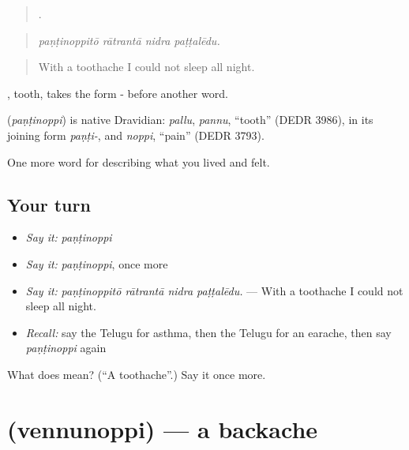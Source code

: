 \begin{quote}
   .
\end{quote}

\begin{quote}
\emph{paṇṭinoppitō rātrantā nidra paṭṭalēdu.}
\end{quote}

\begin{quote}
With a toothache I could not sleep all night.
\end{quote}

, tooth, takes the form - before another word.

\begin{cousinweb}
\textbf{} (\emph{paṇṭinoppi}) is native Dravidian: \emph{pallu}, \emph{pannu}, \textquotedblleft{}tooth\textquotedblright{} (DEDR 3986), in its joining form \emph{paṇṭi-}, and \emph{noppi}, \textquotedblleft{}pain\textquotedblright{} (DEDR 3793).
\end{cousinweb}

\begin{grammarlens}[title={What you've built}]
One more word for describing what you lived and felt.
\end{grammarlens}

\subsection*{Your turn}
\begin{itemize}
\raggedright
  \item \emph{Say it:} \emph{paṇṭinoppi}
  \item \emph{Say it:} \emph{paṇṭinoppi}, once more
  \item \emph{Say it:} \emph{paṇṭinoppitō rātrantā nidra paṭṭalēdu.} — With a toothache I could not sleep all night.
  \item \emph{Recall:} say the Telugu for asthma, then the Telugu for an earache, then say \emph{paṇṭinoppi} again
\end{itemize}

\begin{tcolorbox}[breakable,colback=teal!4,colframe=teal!35!black,title={Before you move on}]
What does  mean? (\textquotedblleft{}A toothache\textquotedblright{}.) Say it once more.
\end{tcolorbox}
\section[\texorpdfstring{\te{వెన్నునొప్పి} (vennunoppi)}{వెన్నునొప్పి (vennunoppi)}]{ (vennunoppi) — a backache}

